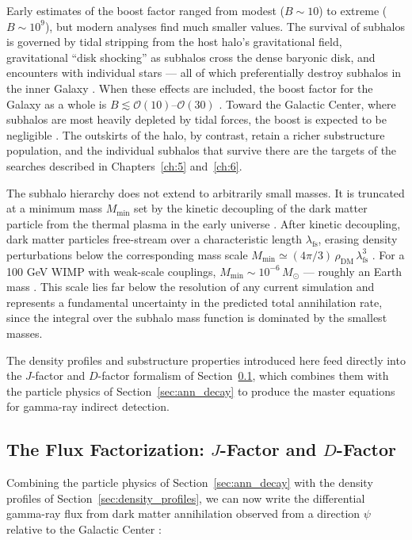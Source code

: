 Early estimates of the boost factor ranged from modest ($B \sim 10$) to extreme ($B \sim 10^9$), but modern analyses find much smaller values.
The survival of subhalos is governed by tidal stripping from the host halo's gravitational field, gravitational ``disk shocking'' as subhalos cross the dense baryonic disk, and encounters with individual stars --- all of which preferentially destroy subhalos in the inner Galaxy \cite{Cirelli:2024ssz}.
When these effects are included, the boost factor for the Galaxy as a whole is $B \lesssim \mathcal{O}(10)$--$\mathcal{O}(30)$ \cite{Cirelli:2024ssz}.
Toward the Galactic Center, where subhalos are most heavily depleted by tidal forces, the boost is expected to be negligible \cite{Cirelli:2024ssz}.
The outskirts of the halo, by contrast, retain a richer substructure population, and the individual subhalos that survive there are the targets of the searches described in Chapters~\ref{ch:5} and~\ref{ch:6}.

The subhalo hierarchy does not extend to arbitrarily small masses.
It is truncated at a minimum mass $M_\text{min}$ set by the kinetic decoupling of the dark matter particle from the thermal plasma in the early universe \cite{Cirelli:2024ssz}.
After kinetic decoupling, dark matter particles free-stream over a characteristic length $\lambda_\text{fs}$, erasing density perturbations below the corresponding mass scale $M_\text{min} \simeq (4\pi/3)\, \rho_\text{DM}\, \lambda_\text{fs}^3$ \cite{Cirelli:2024ssz}.
For a 100 GeV WIMP with weak-scale couplings, $M_\text{min} \sim 10^{-6}\, M_\odot$ --- roughly an Earth mass \cite{Cirelli:2024ssz}.
This scale lies far below the resolution of any current simulation and represents a fundamental uncertainty in the predicted total annihilation rate, since the integral over the subhalo mass function is dominated by the smallest masses.

The density profiles and substructure properties introduced here feed directly into the $J$-factor and $D$-factor formalism of Section~\ref{sec:jfactor}, which combines them with the particle physics of Section~\ref{sec:ann_decay} to produce the master equations for gamma-ray indirect detection.

\subsection{The Flux Factorization: $J$-Factor and $D$-Factor}
\label{sec:jfactor}

Combining the particle physics of Section~\ref{sec:ann_decay} with the density profiles of Section~\ref{sec:density_profiles}, we can now write the differential gamma-ray flux from dark matter annihilation observed from a direction $\psi$ relative to the Galactic Center \cite{Cirelli:2024ssz,Hooper:2024}:

